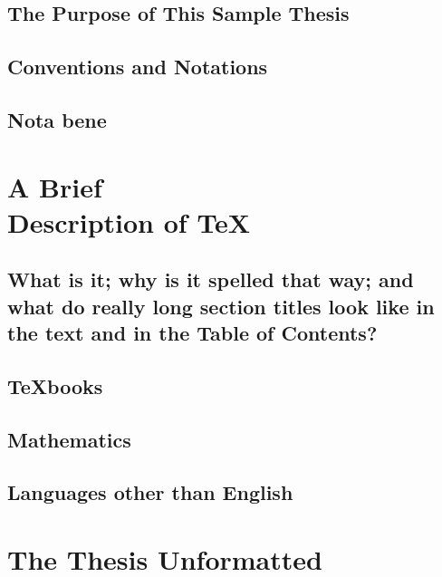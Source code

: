 \documentclass [11pt, proquest] {uwthesis}[2020/02/24]
\begin{document}
\section{The Purpose of This Sample Thesis}




\section{Conventions and Notations}




\section{Nota bene}





\chapter{A Brief \\ Description of \protect\TeX}


\section{What is it; why is it spelled that way;
  and what do
  really long section titles look like in the text and in the
  Table of Contents?}


\section{\TeX books}



\section{Mathematics}





\section{Languages other than English}




\chapter{The Thesis Unformatted}
\end{document}
